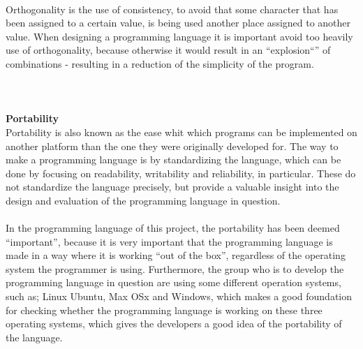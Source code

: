  \\
Orthogonality is the use of consistency, to avoid that some character that has been assigned to a certain value, is being used another place assigned to another value. When designing a programming language it is important avoid too heavily use of orthogonality, because otherwise it would result in an ``explosion``'' of combinations - resulting in a reduction of the simplicity of the program.
\\ \\
\\ \\
\textbf{Portability} \\
Portability is also known as the ease whit which programs can be implemented on another platform than the one they were originally developed for. The way to make a programming language is by standardizing the language, which can be done by focusing on readability, writability and reliability, in particular. These do not standardize the language precisely, but provide a valuable insight into the design and evaluation of the programming language in question.
\\ \\
In the programming language of this project, the portability has been deemed ``important'', because it is very important that the programming language is made in a way where it is working ``out of the box'', regardless of the operating system the programmer is using. Furthermore, the group who is to develop the programming language in question are using some different operation systems, such as; Linux Ubuntu, Max OSx and Windows, which makes a good foundation for checking whether the programming language is working on these three operating systems, which gives the developers a good idea of the portability of the language.
\\ \\
